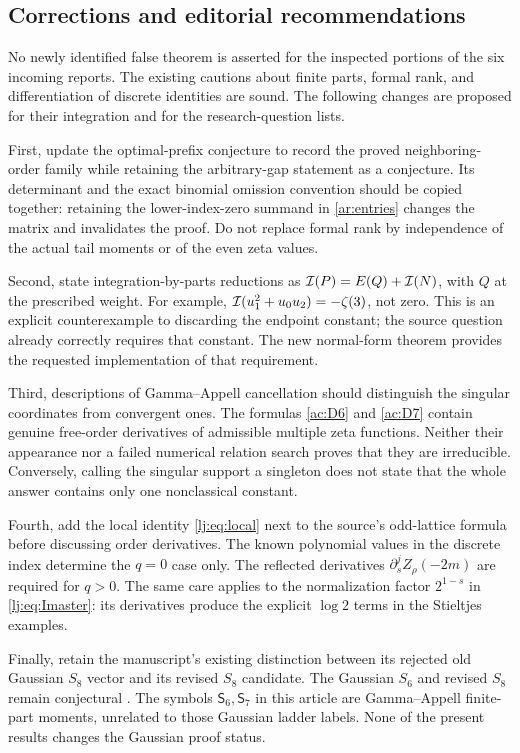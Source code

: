 \subsection{Corrections and editorial recommendations}

No newly identified false theorem is asserted for the inspected portions
of the six incoming reports. The existing cautions about finite parts,
formal rank, and differentiation of discrete identities are sound.
The following changes are proposed for their integration and for the
research-question lists.

First, update the optimal-prefix conjecture to record the proved
neighboring-order family while retaining the arbitrary-gap statement as a
conjecture. Its determinant and the exact binomial omission convention
should be copied together: retaining the lower-index-zero summand in
\eqref{ar:entries} changes the matrix and invalidates the proof.
Do not replace formal rank by independence of the actual tail
moments or of the even zeta values.

Second, state integration-by-parts reductions as
$\mathcal I(P)=E(Q)+\mathcal I(N)$, with $Q$ at the prescribed weight. For example,
$\mathcal I(u_1^2+u_0u_2)=-\zeta(3)$, not zero. This is an explicit
counterexample to discarding the endpoint constant; the source question
already correctly requires that constant. The new normal-form theorem
provides the requested implementation of that requirement.

Third, descriptions of Gamma--Appell cancellation should distinguish the
singular coordinates from convergent ones. The formulas
\eqref{ac:D6} and \eqref{ac:D7} contain genuine free-order derivatives
of admissible multiple zeta functions. Neither their appearance nor a
failed numerical relation search proves that they are irreducible.
Conversely, calling the singular support a singleton does not state
that the whole answer contains only one nonclassical constant.

Fourth, add the local identity \eqref{lj:eq:local} next to the source's
odd-lattice formula before discussing order derivatives. The known
polynomial values in the discrete index determine the $q=0$ case only.
The reflected derivatives $\partial_s^jZ_\rho(-2m)$ are required for
$q>0$. The same care applies to the normalization factor $2^{1-s}$
in \eqref{lj:eq:Imaster}: its derivatives produce the explicit
$\log 2$ terms in the Stieltjes examples.

Finally, retain the manuscript's existing distinction between its
rejected old Gaussian $S_8$ vector and its revised $S_8$ candidate.
The Gaussian $S_6$ and revised $S_8$ remain conjectural
\cite{Repo}. The symbols $\mathsf S_6,\mathsf S_7$ in this article
are Gamma--Appell finite-part moments, unrelated to those Gaussian
ladder labels. None of the present results changes the Gaussian
proof status.

